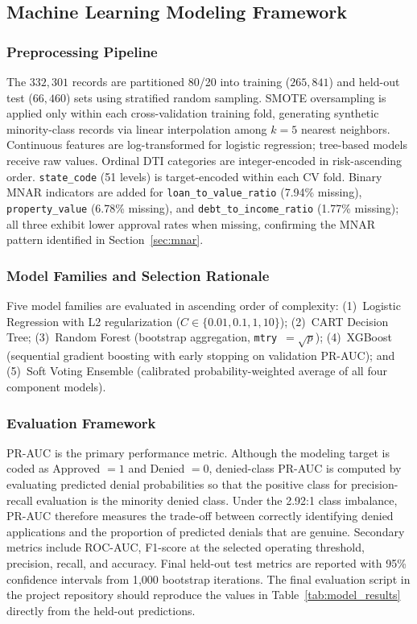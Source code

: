 \documentclass[12pt,letterpaper]{article}
\begin{document}
\subsection{Machine Learning Modeling Framework}
\label{sec:ml}

\subsubsection{Preprocessing Pipeline}

The $332{,}301$ records are partitioned 80/20 into training ($265{,}841$) and held-out test
($66{,}460$) sets using stratified random sampling. SMOTE oversampling is applied only within
each cross-validation training fold, generating synthetic minority-class records via linear
interpolation among $k=5$ nearest neighbors. Continuous features are log-transformed for
logistic regression; tree-based models receive raw values. Ordinal DTI categories are
integer-encoded in risk-ascending order. \texttt{state\_code} (51 levels) is target-encoded
within each CV fold. Binary MNAR indicators are added for \texttt{loan\_to\_value\_ratio}
(7.94\% missing), \texttt{property\_value} (6.78\% missing), and
\texttt{debt\_to\_income\_ratio} (1.77\% missing); all three exhibit lower approval rates
when missing, confirming the MNAR pattern identified in Section~\ref{sec:mnar}.

\subsubsection{Model Families and Selection Rationale}

Five model families are evaluated in ascending order of complexity:
(1)~Logistic Regression with L2 regularization ($C \in \{0.01, 0.1, 1, 10\}$);
(2)~CART Decision Tree;
(3)~Random Forest (bootstrap aggregation, \texttt{mtry}~$= \sqrt{p}$);
(4)~XGBoost (sequential gradient boosting with early stopping on validation PR-AUC); and
(5)~Soft Voting Ensemble (calibrated probability-weighted average of all four component models).

\subsubsection{Evaluation Framework}

PR-AUC is the primary performance metric. Although the modeling target is coded as Approved
$=1$ and Denied $=0$, denied-class PR-AUC is computed by evaluating predicted denial
probabilities so that the positive class for precision-recall evaluation is the minority denied
class. Under the 2.92:1 class imbalance, PR-AUC therefore measures the trade-off between
correctly identifying denied applications and the proportion of predicted denials that are genuine.
Secondary metrics include ROC-AUC, F1-score at the selected operating threshold, precision,
recall, and accuracy. Final held-out test metrics are reported with 95\% confidence intervals
from 1{,}000 bootstrap iterations. The final evaluation script in the project repository should
reproduce the values in Table~\ref{tab:model_results} directly from the held-out predictions.
\end{document}
